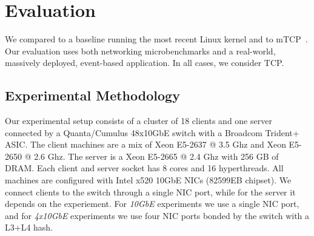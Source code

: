 
\section{Evaluation}
\label{sec:eval}


We compared \ix to a baseline running the most recent Linux kernel and to
mTCP~\cite{jeong2014mtcp}. Our evaluation uses both networking
microbenchmarks and a real-world, massively deployed, event-based
application. In all cases, we consider TCP.

\subsection{Experimental Methodology}
\label{sec:eval:setup}



 





Our experimental setup consists of a cluster of 18 clients
and one server connected by
a Quanta/Cumulus 48x10GbE switch with a Broadcom Trident+ ASIC.
The client machines are a mix of Xeon E5-2637 @ 3.5 Ghz and Xeon
E5-2650 @ 2.6 Ghz. The server is a Xeon E5-2665 @ 2.4 Ghz with
256 GB of DRAM.  Each client and server
socket has 8 cores and 16 hyperthreads. All machines are configured
with Intel x520 10GbE NICs (82599EB chipset). We connect clients
to the switch through a single NIC port, while for the server it depends
on the experiement. For \emph{10GbE} experiments we use a single
NIC port, and for \emph{4x10GbE} experiments we use four NIC ports
bonded by the switch with a L3+L4 hash.

